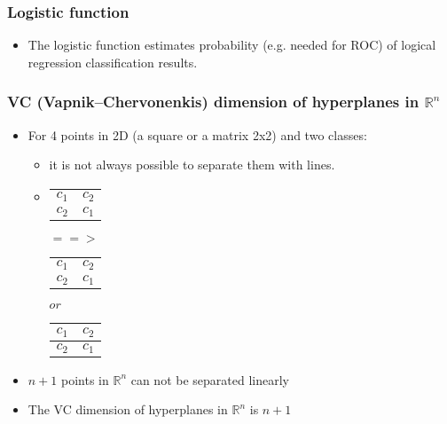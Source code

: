 \documentclass[proffesionalfonts]{beamer}
\begin{document}
\begin{frame}
\frametitle{Logistic function}
\begin{block}{}
\begin{itemize}
\item The logistic function estimates probability (e.g. needed for ROC) of logical regression classification results.
\end{itemize}
\end{block}
\end{frame}

\begin{frame}
\frametitle{VC (Vapnik–Chervonenkis) dimension of hyperplanes in $\mathbb R^n$}
  \begin{itemize}
  \item For 4 points in 2D (a square or a matrix 2x2) and two classes:
    \begin{itemize}
    \item it is not always possible to separate them with lines. 
	\item[\ ]
	\begin{tabular}{cc}
	$c_1$ & $c_2$ \\
	$c_2$ & $c_1$ \\
	\end{tabular}
	$==>$
	\begin{tabular}{c|c}
	$c_1$ & $c_2$ \\
	$c_2$ & $c_1$ \\
	\end{tabular}
	$or$
	\begin{tabular}{cc}
	$c_1$ & $c_2$ \\
	\hline
	$c_2$ & $c_1$ \\
	\end{tabular}
    \end{itemize}
  \item $n+1$ points in  $\mathbb R^n$ can not be separated linearly
  \item The VC dimension of hyperplanes in $\mathbb R^n$ is $n + 1$
  \end{itemize}
\end{frame}
\end{document}
